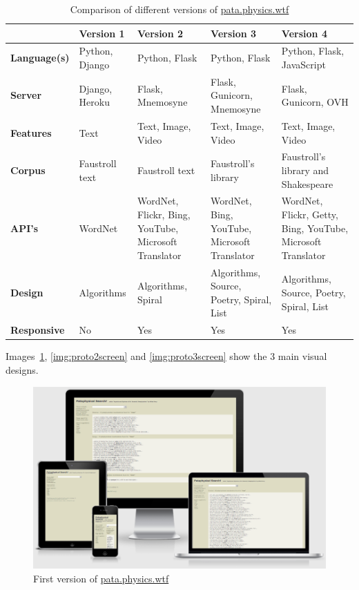\begin{table}[!htbp]
  \centering
  \footnotesize
  \caption[Comparison of different versions of \url{pata.physics.wtf}]{Comparison of different versions of \url{pata.physics.wtf}}
  \label{tab:versions}
  \begin{tabu}{X[l]X[l]X[l,1.2]X[l,1.5]X[l,2]}
  \toprule
  & \textbf{Version 1} & \textbf{Version 2} & \textbf{Version 3} & \textbf{Version 4} \\ 
  \midrule
  \textbf{Language(s)} & Python, Django & Python, Flask & Python, Flask & Python, Flask, JavaScript \\
  \textbf{Server} & Django, Heroku & Flask, Mnemosyne & Flask, Gunicorn, Mnemosyne & Flask, Gunicorn, OVH \\
  \textbf{Features} & Text & Text, Image, Video & Text, Image, Video & Text, Image, Video \\
  \textbf{Corpus} & Faustroll text & Faustroll text & Faustroll's library & Faustroll's library and Shakespeare \\
  \textbf{API's} & WordNet & WordNet, Flickr, Bing, YouTube, Microsoft Translator & WordNet, Bing, YouTube, Microsoft Translator & WordNet, Flickr, Getty, Bing, YouTube, Microsoft Translator \\
  \textbf{Design} & Algorithms & Algorithms, Spiral & Algorithms, Source, Poetry, Spiral, List & Algorithms, Source, Poetry, Spiral, List \\ 
  \textbf{Responsive} & No & Yes & Yes & Yes \\ 
  \bottomrule
  \end{tabu}
\end{table}

Images~\ref{img:proto1screen}, \ref{img:proto2screen} and \ref{img:proto3screen} show the 3 main visual designs.

\begin{figure}[!htbp] %
  \centering
  \includegraphics[width=\linewidth]{images/proto1screen}
\caption[First version of \url{pata.physics.wtf}]{First version of \url{pata.physics.wtf}}
\label{img:proto1screen}
\end{figure}

